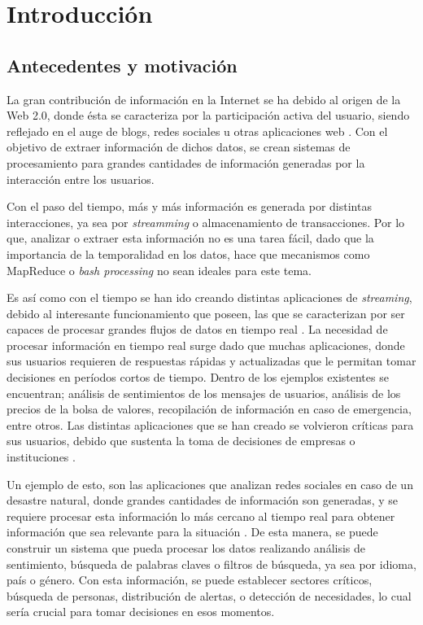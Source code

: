 \chapter{Introducción}
\label{cap:introduccion}

\section{Antecedentes y motivación}
\label{intro:motivacion}

La gran contribución de información en la Internet se ha debido al origen de la Web 2.0, donde ésta se caracteriza por la participación activa del usuario, siendo reflejado en el auge de blogs, redes sociales u otras aplicaciones web \citep{web2007oberhelman}. Con el objetivo de extraer información de dichos datos, se crean sistemas de procesamiento para grandes cantidades de información generadas por la interacción entre los usuarios.

Con el paso del tiempo, más y más información es generada por distintas interacciones, ya sea por \textit{streamming} o almacenamiento de transacciones. Por lo que, analizar o extraer esta información no es una tarea fácil, dado que la importancia de la temporalidad en los datos, hace que mecanismos como MapReduce \citep{2010Lin} o \textit{bash processing} \citep{HawwashN14} no sean ideales para este tema.

Es así como con el tiempo se han ido creando distintas aplicaciones de \textsl{streaming}, debido al interesante funcionamiento que poseen, las que se caracterizan por ser capaces de procesar grandes flujos de datos en tiempo real \citep{ChenZ14a}. La necesidad de procesar informaci\'on en tiempo real surge dado que muchas aplicaciones, donde sus usuarios requieren de respuestas r\'apidas y actualizadas que le permitan tomar decisiones en per\'iodos cortos de tiempo. Dentro de los ejemplos existentes se encuentran; análisis de sentimientos de los mensajes de usuarios, análisis de los precios de la bolsa de valores, recopilación de información en caso de emergencia, entre otros. Las distintas aplicaciones que se han creado se volvieron críticas para sus usuarios, debido que sustenta la toma de decisiones de empresas o instituciones \citep{Wenzel14}.

Un ejemplo de esto, son las aplicaciones que analizan redes sociales en caso de un desastre natural, donde grandes cantidades de información son generadas, y se requiere procesar esta información lo más cercano al tiempo real para obtener información que sea relevante para la situación \citep{andrade2014fundamentals}. De esta manera, se puede construir un sistema que pueda procesar los datos realizando análisis de sentimiento, búsqueda de palabras claves o filtros de búsqueda, ya sea por idioma, país o género. Con esta información, se puede establecer sectores críticos, búsqueda de personas, distribución de alertas, o detección de necesidades, lo cual sería crucial para tomar decisiones en esos momentos.

